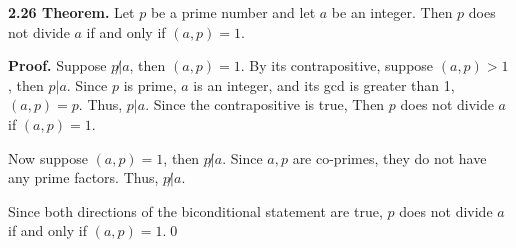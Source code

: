 \documentclass[12pt]{article}
\begin{document}
\noindent\textbf{2.26 Theorem.} Let $p$ be a prime number and let $a$ be an integer. Then $p$ does not divide $a$ if and only if $(a,p)=1$.

\bigskip

\noindent\textbf{Proof.} Suppose $p\not| a$, then $(a,p)=1$. By its contrapositive, suppose $(a,p)>1$, then $p|a$. Since $p$ is prime, $a$ is an integer, and its gcd is greater than 1, $(a,p)=p$. Thus, $p|a$. Since the contrapositive is true, Then $p$ does not divide $a$ if $(a,p)=1$.

\bigskip

\noindent Now suppose $(a,p)=1$, then $p\not| a$. Since $a,p$ are co-primes, they do not have any prime factors. Thus, $p\not| a$.

\bigskip

\noindent Since both directions of the biconditional statement are true, $p$ does not divide $a$ if and only if $(a,p)=1$.\qed
\end{document}
